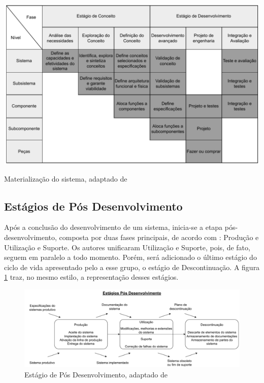 	\begin{table}[H]
		\centering
		\includegraphics[width=\textwidth]{./figuras/systemMaterialization.pdf}
		\caption{Materialização do sistema, adaptado de \citep{kossiakoff2020systems}}
		\label{tab:revisao:systemMaterialization}
	\end{table}

	\subsection{Estágios de Pós Desenvolvimento}\label{sec:revisao:ciclodevida:posDev}
	Após a conclusão do desenvolvimento de um sistema, inicia-se a etapa pós-desenvolvimento, composta por duas fases principais, de acordo com
	\citep{kossiakoff2020systems}: Produção e Utilização e Suporte. Os autores unificaram Utilização e Suporte, pois, de fato, seguem em paralelo a todo momento.
	Porém, será adicionado o último estágio do ciclo de vida apresentado pelo \cite{incoseHandbook} a esse grupo, o estágio de Descontinuação. A figura
	\ref{fig:revisao:postDevelopment} traz, no mesmo estilo, a representação desses estágios.

	\begin{figure}[h]
		\centering
		\includegraphics[width=\textwidth]{./figuras/postDevelopment.pdf}
		\caption{Estágio de Pós Desenvolvimento, adaptado de \citep{kossiakoff2020systems}}
		\label{fig:revisao:postDevelopment}
	\end{figure}
	
